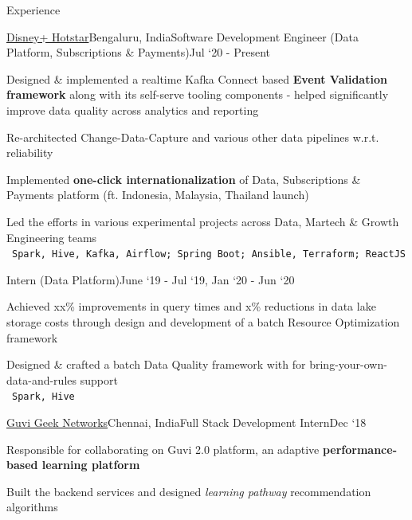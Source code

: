\documentclass{resume}
\begin{document}
  
  \begin{rSection}{Experience}
  
    \begin{rSubsection}{\href{https://tech.hotstar.com/}{Disney+ Hotstar}}{Bengaluru, India}{Software Development Engineer (Data Platform, Subscriptions \& Payments)}{Jul `20 - Present}
      \item Designed \& implemented a realtime Kafka Connect based \textbf{Event Validation framework} along with its self-serve tooling components - helped significantly improve data quality across analytics and reporting
      \item Re-architected Change-Data-Capture and various other data pipelines w.r.t. reliability
      \item Implemented \textbf{one-click internationalization} of Data, Subscriptions \& Payments platform (ft. Indonesia, Malaysia, Thailand launch)
      \item Led the efforts in various experimental projects across Data, Martech \& Growth Engineering teams\\
    \textbullet\ \texttt{Spark, Hive, Kafka, Airflow; Spring Boot; Ansible, Terraform; ReactJS}
    \end{rSubsection}
    
    \vspace*{-\baselineskip}

    \begin{rSubsection}{}{}{Intern (Data Platform)}{June `19 - Jul `19, Jan `20 - Jun `20}
    \item Achieved xx\% improvements in query times and x\% reductions in data lake storage costs through design and development of a batch Resource Optimization framework
    \item Designed \& crafted a batch Data Quality framework with for bring-your-own-data-and-rules support\\
    \textbullet\ \texttt{Spark, Hive}
    \end{rSubsection}

    \begin{rSubsection}{\href{https://www.guvi.in/}{Guvi Geek Networks}}{Chennai, India}{Full Stack Development Intern}{Dec `18}
    \item Responsible for collaborating on Guvi 2.0 platform, an adaptive \textbf{performance-based learning platform}
    \item Built the backend services and designed \textit{learning pathway} recommendation algorithms
    \end{rSubsection}
    \vspace*{-\baselineskip}


\end{rSection}
\end{document}
